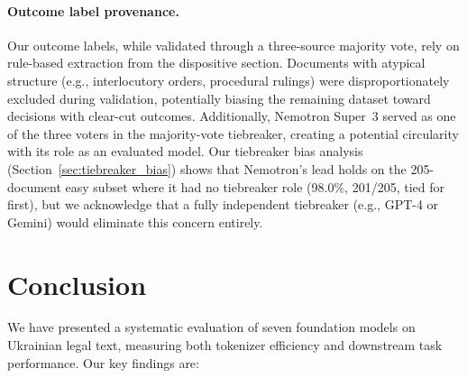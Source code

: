 \documentclass[11pt,a4paper]{article}
\begin{document}
\paragraph{Outcome label provenance.} Our outcome labels, while validated through a three-source majority vote, rely on rule-based extraction from the dispositive section. Documents with atypical structure (e.g., interlocutory orders, procedural rulings) were disproportionately excluded during validation, potentially biasing the remaining dataset toward decisions with clear-cut outcomes. Additionally, Nemotron Super~3 served as one of the three voters in the majority-vote tiebreaker, creating a potential circularity with its role as an evaluated model. Our tiebreaker bias analysis (Section~\ref{sec:tiebreaker_bias}) shows that Nemotron's lead holds on the 205-document easy subset where it had no tiebreaker role (98.0\%, 201/205, tied for first), but we acknowledge that a fully independent tiebreaker (e.g., GPT-4 or Gemini) would eliminate this concern entirely.

\section{Conclusion}

We have presented a systematic evaluation of seven foundation models on Ukrainian legal text, measuring both tokenizer efficiency and downstream task performance. Our key findings are:
\end{document}

